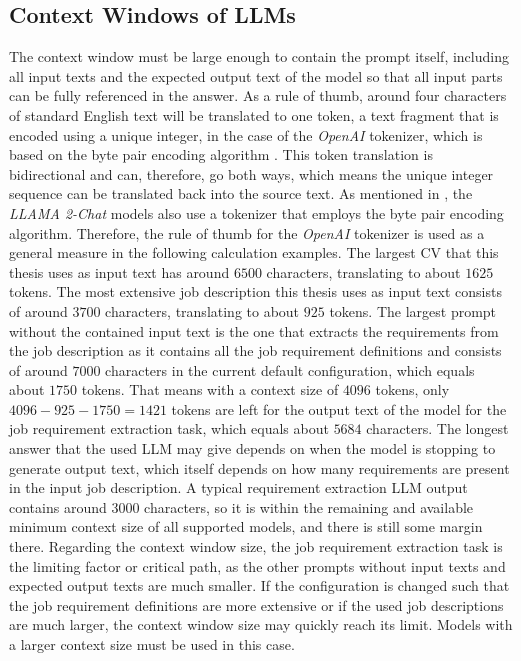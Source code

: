 \documentclass[draft,final]{thesisclass} %
\begin{document}
\subsection{Context Windows of \gls{LLM}s}
The context window must be large enough to contain the prompt itself, including all input texts and the expected output text of the model so that all input parts can be fully referenced in the answer.
As a rule of thumb, around four characters of standard English text will be translated to one token, a text fragment that is encoded using a unique integer, in the case of the \textit{OpenAI} tokenizer, which is based on the byte pair encoding algorithm \parencite{openai_tokenizer}.
This token translation is bidirectional and can, therefore, go both ways, which means the unique integer sequence can be translated back into the source text.
As mentioned in \textcite[6]{llama2}, the \textit{LLAMA 2-Chat} models also use a tokenizer that employs the byte pair encoding algorithm. Therefore, the rule of thumb for the \textit{OpenAI} tokenizer is used as a general measure in the following calculation examples.
The largest \acs{CV} that this thesis uses as input text has around $6500$ characters, translating to about $1625$ tokens.
The most extensive job description this thesis uses as input text consists of around $3700$ characters, translating to about $925$ tokens.
The largest prompt without the contained input text is the one that extracts the requirements from the job description as it contains all the job requirement definitions and consists of around $7000$ characters in the current default configuration, which equals about $1750$ tokens.
That means with a context size of $4096$ tokens, only $4096-925-1750=1421$ tokens are left for the output text of the model for the job requirement extraction task, which equals about $5684$ characters.
The longest answer that the used \gls{LLM} may give depends on when the model is stopping to generate output text, which itself depends on how many requirements are present in the input job description.
A typical requirement extraction \gls{LLM} output contains around $3000$ characters, so it is within the remaining and available minimum context size of all supported models, and there is still some margin there.
Regarding the context window size, the job requirement extraction task is the limiting factor or critical path, as the other prompts without input texts and expected output texts are much smaller.
If the configuration is changed such that the job requirement definitions are more extensive or if the used job descriptions are much larger, the context window size may quickly reach its limit. Models with a larger context size must be used in this case.
\end{document}
